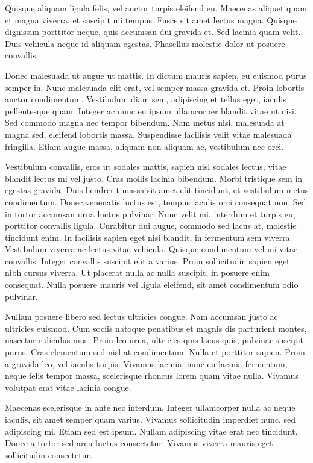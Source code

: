 \documentclass[journal]{IEEEtran}
\begin{document}
Quisque aliquam ligula felis, vel auctor turpis eleifend eu. Maecenas aliquet quam et magna viverra, et suscipit mi tempus. Fusce sit amet lectus magna. Quisque dignissim porttitor neque, quis accumsan dui gravida et. Sed lacinia quam velit. Duis vehicula neque id aliquam egestas. Phasellus molestie dolor ut posuere convallis.

Donec malesuada ut augue ut mattis. In dictum mauris sapien, eu euismod purus semper in. Nunc malesuada elit erat, vel semper massa gravida et. Proin lobortis auctor condimentum. Vestibulum diam sem, adipiscing et tellus eget, iaculis pellentesque quam. Integer ac nunc eu ipsum ullamcorper blandit vitae ut nisi. Sed commodo magna nec tempor bibendum. Nam metus nisi, malesuada at magna sed, eleifend lobortis massa. Suspendisse facilisis velit vitae malesuada fringilla. Etiam augue massa, aliquam non aliquam ac, vestibulum nec orci.

Vestibulum convallis, eros ut sodales mattis, sapien nisl sodales lectus, vitae blandit lectus mi vel justo. Cras mollis lacinia bibendum. Morbi tristique sem in egestas gravida. Duis hendrerit massa sit amet elit tincidunt, et vestibulum metus condimentum. Donec venenatis luctus est, tempus iaculis orci consequat non. Sed in tortor accumsan urna luctus pulvinar. Nunc velit mi, interdum et turpis eu, porttitor convallis ligula. Curabitur dui augue, commodo sed lacus at, molestie tincidunt enim. In facilisis sapien eget nisi blandit, in fermentum sem viverra. Vestibulum viverra ac lectus vitae vehicula. Quisque condimentum vel mi vitae convallis. Integer convallis suscipit elit a varius. Proin sollicitudin sapien eget nibh cursus viverra. Ut placerat nulla ac nulla suscipit, in posuere enim consequat. Nulla posuere mauris vel ligula eleifend, sit amet condimentum odio pulvinar.

Nullam posuere libero sed lectus ultricies congue. Nam accumsan justo ac ultricies euismod. Cum sociis natoque penatibus et magnis dis parturient montes, nascetur ridiculus mus. Proin leo urna, ultricies quis lacus quis, pulvinar suscipit purus. Cras elementum sed nisl at condimentum. Nulla et porttitor sapien. Proin a gravida leo, vel iaculis turpis. Vivamus lacinia, nunc eu lacinia fermentum, neque felis tempor massa, scelerisque rhoncus lorem quam vitae nulla. Vivamus volutpat erat vitae lacinia congue.

Maecenas scelerisque in ante nec interdum. Integer ullamcorper nulla ac neque iaculis, sit amet semper quam varius. Vivamus sollicitudin imperdiet nunc, sed adipiscing mi. Etiam sed est ipsum. Nullam adipiscing vitae erat nec tincidunt. Donec a tortor sed arcu luctus consectetur. Vivamus viverra mauris eget sollicitudin consectetur.
\end{document}
